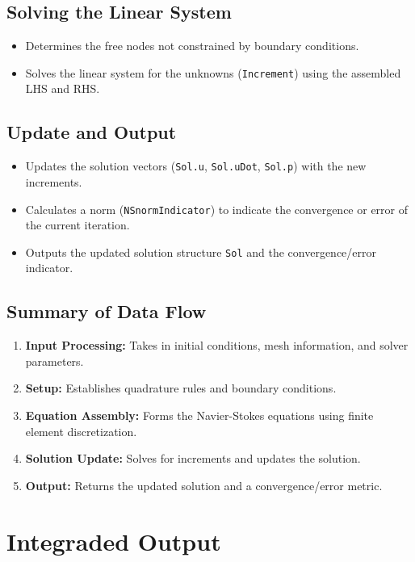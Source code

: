 \documentclass[a4paper,12pt]{article} %
\begin{document}
\subsection*{Solving the Linear System}
\begin{itemize}
    \item Determines the free nodes not constrained by boundary conditions.
    \item Solves the linear system for the unknowns (\texttt{Increment}) using the assembled LHS and RHS.
\end{itemize}

\subsection*{Update and Output}
\begin{itemize}
    \item Updates the solution vectors (\texttt{Sol.u}, \texttt{Sol.uDot}, \texttt{Sol.p}) with the new increments.
    \item Calculates a norm (\texttt{NSnormIndicator}) to indicate the convergence or error of the current iteration.
    \item Outputs the updated solution structure \texttt{Sol} and the convergence/error indicator.
\end{itemize}

\subsection*{Summary of Data Flow}
\begin{enumerate}
    \item \textbf{Input Processing:} Takes in initial conditions, mesh information, and solver parameters.
    \item \textbf{Setup:} Establishes quadrature rules and boundary conditions.
    \item \textbf{Equation Assembly:} Forms the Navier-Stokes equations using finite element discretization.
    \item \textbf{Solution Update:} Solves for increments and updates the solution.
    \item \textbf{Output:} Returns the updated solution and a convergence/error metric.
\end{enumerate}


\section{Integraded Output}
\end{document}
